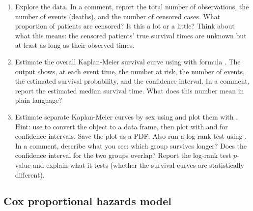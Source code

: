 \begin{enumerate}[label=\alph*)]

  \item Explore the data. In a comment, report the total number of observations, the number of events (deaths), and the number of censored cases. What proportion of patients are censored? Is this a lot or a little? Think about what this means: the censored patients' true survival times are unknown but at least as long as their observed times.

  \item Estimate the overall Kaplan-Meier survival curve using  with formula . The  output shows, at each event time, the number at risk, the number of events, the estimated survival probability, and the confidence interval. In a comment, report the estimated median survival time. What does this number mean in plain language?

  \item Estimate separate Kaplan-Meier curves by sex using  and plot them with . Hint: use  to convert the  object to a data frame, then plot with  and  for confidence intervals. Save the plot as a PDF. Also run a log-rank test using . In a comment, describe what you see: which group survives longer? Does the confidence interval for the two groups overlap? Report the log-rank test $p$-value and explain what it tests (whether the survival curves are statistically different).

\end{enumerate}

\subsection{Cox proportional hazards model}

